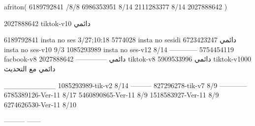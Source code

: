 afriton(
6189792841 /8/8
6986353951 8/14
2111283377 8/14
2027888642
)

2027888642 tiktok-v10
دائمي

6189792841 insta no ses
3/27;10:18
5774028 insta no sesidi
دائمي
6723423247 insta no ses-v10
9/3
1085293989 insta no ses-v12
8/14
------------
5754454119 facbook-v8
دائمي
--------------
2027888642 tiktok-v8
دائمي
5909533996 tiktok-v1000
دائمي مع التحديث

__________
1085293989-tik-v2
8/14
---------
827296278-tik-v7
8/9
------------
6785389126-Ver-11
8/17
5460890865-Ver-11
8/9
1518583927-Ver-11
8/9
6274626530-Ver-11
8/10

---------
------
